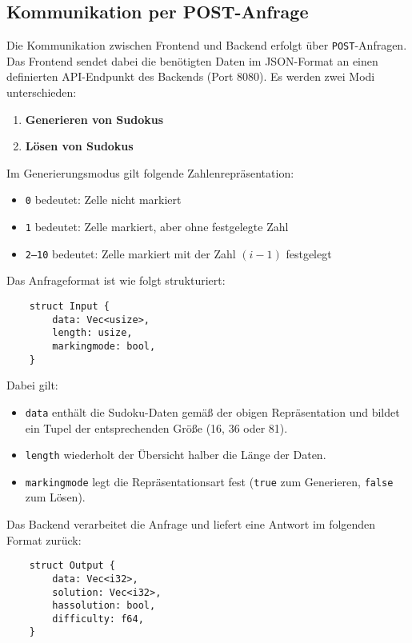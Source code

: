 \subsection{Kommunikation per POST-Anfrage}

Die Kommunikation zwischen Frontend und Backend erfolgt über \texttt{POST}-Anfragen. Das Frontend sendet dabei die benötigten Daten im JSON-Format an einen definierten API-Endpunkt des Backends (Port 8080).  
Es werden zwei Modi unterschieden:
\begin{enumerate}
	\item \textbf{Generieren von Sudokus}
	\item \textbf{Lösen von Sudokus}
\end{enumerate}

Im Generierungsmodus gilt folgende Zahlenrepräsentation:
\begin{itemize}
	\item \texttt{0} bedeutet: Zelle nicht markiert
	\item \texttt{1} bedeutet: Zelle markiert, aber ohne festgelegte Zahl
	\item \texttt{2--10} bedeutet: Zelle markiert mit der Zahl $(i-1)$ festgelegt
\end{itemize}

Das Anfrageformat ist wie folgt strukturiert:

\begin{verbatim}
	struct Input {
		data: Vec<usize>,
		length: usize,
		markingmode: bool,  
	}
\end{verbatim}

Dabei gilt:
\begin{itemize}
	\item \texttt{data} enthält die Sudoku-Daten gemäß der obigen Repräsentation und bildet ein Tupel der entsprechenden Größe (16, 36 oder 81).
	\item \texttt{length} wiederholt der Übersicht halber die Länge der Daten.
	\item \texttt{markingmode} legt die Repräsentationsart fest (\texttt{true} zum Generieren, \texttt{false} zum Lösen).
\end{itemize}

Das Backend verarbeitet die Anfrage und liefert eine Antwort im folgenden Format zurück:

\begin{verbatim}
	struct Output {
		data: Vec<i32>,
		solution: Vec<i32>,
		hassolution: bool,
		difficulty: f64,
	}
\end{verbatim}

